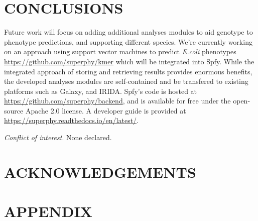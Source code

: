 \documentclass{article}
\begin{document}
\section{CONCLUSIONS}

Future work will focus on adding additional analyses modules to aid genotype to phenotype predictions, and supporting different species. We're currently working on an approach using support vector machines to predict \textit{E.coli} phenotypes \url{https://github.com/superphy/kmer} which will be integrated into Spfy. While the integrated approach of storing and retrieving results provides enormous benefits, the developed analyses modules are self-contained and be transfered to existing platforms such as Galaxy, and IRIDA. Spfy's code is hosted at \url{https://github.com/superphy/backend}, and is available for free under the open-source Apache 2.0 license. A developer guide is provided at \url{https://superphy.readthedocs.io/en/latest/}.

\textit{Conflict of interest}. None declared.

\section{ACKNOWLEDGEMENTS}

\newpage




\newpage

\section{APPENDIX}
\end{document}
